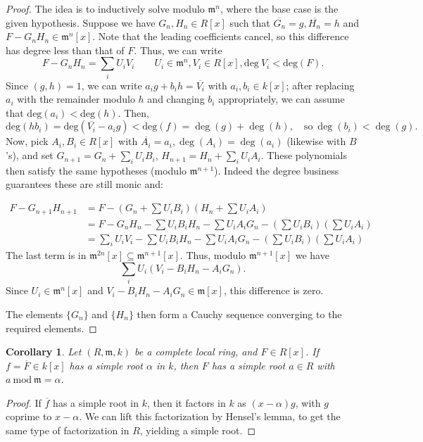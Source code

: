 \documentclass{amsart}[12pt]
\newcommand{\fm}{{\mathfrak m}}
\numberwithin{equation}{section}
\theoremstyle{plain} %
\newtheorem{cor}[equation]{Corollary}
\theoremstyle{definition}
\theoremstyle{remark}
\begin{document}
\begin{proof}
	The idea is to inductively solve modulo $\fm^n$, where the base case is the given hypothesis. Suppose we have $G_n,H_n\in R[x]$ such that $\overline{G_n}=g,\overline{H_n}=h$ and $F-G_n H_n\in \fm^n[x]$. Note that the leading coefficients cancel, so this difference has degree less than that of $F$. Thus, we can write 
	\[ F - G_n H_n = \sum_i U_i V_i \qquad U_i\in \fm^n, V_i\in R[x],  \mathrm{deg} \ V_i < \mathrm{deg}(F). \]
	Since $(g,h)=1$, we can write $a_i g + b_i h = \overline{V_i}$ with $a_i,b_i\in k[x]$; after replacing $a_i$ with the remainder modulo $h$ and changing $b_i$ appropriately, we can assume that $\mathrm{deg}(a_i)<\mathrm{deg}(h)$.
	 Then,
	\[ \mathrm{deg}(h b_i) = \mathrm{deg}(\overline{V_i}-a_i g) < \mathrm{deg}(f) = \deg(g) + \deg(h), \quad \text{so} \ \deg(b_i) < \deg(g). \]
	Now, pick $A_i,B_i\in R[x]$ with $\overline{A_i}=a_i, \deg(A_i)=\deg(a_i)$ (likewise with $B$'s), and set $G_{n+1}=G_n + \sum_i U_i B_i$, $H_{n+1}=H_n + \sum_i U_i A_i$. These polynomials then satisfy the same hypotheses (modulo $\fm^{n+1}$). Indeed the degree business guarantees these are still monic and:
	
	\[\begin{aligned} F- G_{n+1} H_{n+1} &= F - (G_n + \sum U_i B_i )(H_n + \sum U_i A_i) \\&= 
	F - G_n H_n - \sum U_i B_i H_n  - \sum U_i A_i G_n - (\sum U_i B_i )(\sum U_i A_i) \\&=
	\sum_i U_i V_i - \sum U_i B_i H_n  - \sum U_i A_i G_n - (\sum U_i B_i )(\sum U_i A_i) \end{aligned}\]
	The last term is in $\fm^{2n}[x]\subseteq \fm^{n+1}[x]$. Thus, modulo  $\fm^{n+1}[x]$ we have
	\[ \sum_i U_i (V_i - B_i H_n  -A_i G_n).\]
	Since $U_i \in \fm^n[x]$ and $V_i - B_i H_n  -A_i G_n \in \fm[x]$, this difference is zero.
	
	 The elements $\{G_n\}$ and $\{H_n\}$ then form a Cauchy sequence converging to the required elements.
\end{proof}

\begin{cor} 
Let $(R,\fm,k)$ be a complete local ring, and $F\in R[x]$. If $f=\overline{F}\in k[x]$ has a simple root $\alpha$ in $k$, then $F$ has a simple root $a\in R$ with $a \ \mathrm{mod} \ \fm = \alpha$.
\end{cor}
\begin{proof}
	If $\overline{f}$ has a simple root in $k$, then it factors in $k$ as $(x-\alpha) g$, with $g$ coprime to $x-\alpha$. We can lift this factorization by Hensel's lemma, to get the same type of factorization in $R$, yielding a simple root.
\end{proof}
\end{document}
